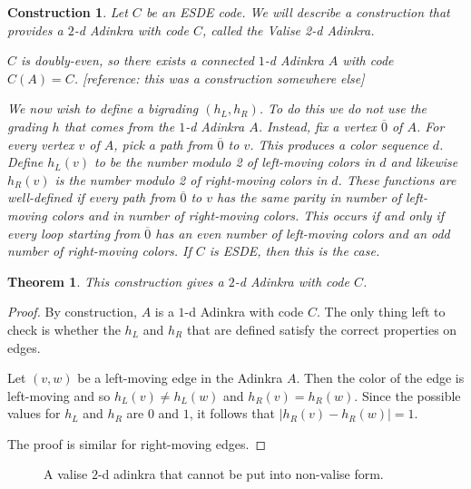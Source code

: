 \documentclass[12pt,twoside,singlespace]{article}
\numberwithin{equation}{section}
\newtheorem{thm}[equation]{Theorem}
\newtheorem{construction}[equation]{Construction}
\theoremstyle{definition}
\begin{document}
\begin{construction}
\label{cons:valise}
Let $C$ be an ESDE code.  We will describe a construction that provides a $2$-d Adinkra with code $C$, called the {\em Valise 2-d Adinkra}.

$C$ is doubly-even, so there exists a connected $1$-d Adinkra $A$ with code $C(A) = C$.  [reference: this was a construction somewhere else]

We now wish to define a bigrading $(h_L,h_R)$.  To do this we do not use the grading $h$ that comes from the $1$-d Adinkra $A$.  Instead, fix a vertex $\overline{0}$ of $A$.  For every vertex $v$ of $A$, pick a path from $\overline{0}$ to $v$.  This produces a color sequence $d$.  Define $h_L(v)$ to be the number modulo 2 of left-moving colors in $d$ and likewise $h_R(v)$ is the number modulo 2 of right-moving colors in $d$.  These functions are well-defined if every path from $\overline{0}$ to $v$ has the same parity in number of left-moving colors and in number of right-moving colors.  This occurs if and only if every loop starting from $\overline{0}$ has an even number of left-moving colors and an odd number of right-moving colors.  If $C$ is ESDE, then this is the case.
\end{construction}

\begin{thm}
This construction gives a $2$-d Adinkra with code $C$.
\end{thm}
\begin{proof}
By construction, $A$ is a $1$-d Adinkra with code $C$.  The only thing left to check is whether the $h_L$ and $h_R$ that are defined satisfy the correct properties on edges.

Let $(v,w)$ be a left-moving edge in the Adinkra $A$.  Then the color of the edge is left-moving and so $h_L(v)\not=h_L(w)$ and $h_R(v)=h_R(w)$.  Since the possible values for $h_L$ and $h_R$ are $0$ and $1$, it follows that $|h_R(v)-h_R(w)|=1$.

The proof is similar for right-moving edges.
\end{proof}




\begin{figure}[htb]
\begin{center}

\caption{A valise $2$-d adinkra that cannot be put into non-valise form.\label{fig:tight valise}}
\end{center}
\end{figure}
\end{document}
